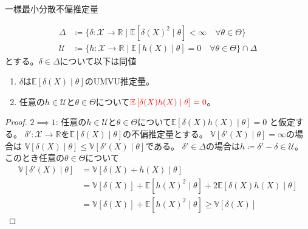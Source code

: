 \documentclass[lualatex,handout]{beamer}
\newcommand{\mycolor}[2]{%
  \begingroup
  \colorlet{currentcolor}{.}%
  \color{#1}#2%
  \color{currentcolor}%
  \endgroup
}
\newcommand{\emm}[1]{\mycolor{red}{#1}}
\newcommand{\expt}[1]{\mathbb{E}\left[#1\right]}
\newcommand{\var}[1]{\mathbb{V}\left[#1\right]}
\theoremstyle{definition}
\begin{document}
\begin{frame}{一様最小分散不偏推定量}
\small
\begin{theorem}

\vspace{-2em}
\begin{align*}
\Delta&\coloneq\{\delta\colon\mathcal{X}\to\mathbb{R}\mid \expt{\delta(X)^2\mid\theta}<\infty \quad\forall\theta\in\Theta\}\\
\mathcal{U}&\coloneq\{h\colon\mathcal{X}\to\mathbb{R}\mid \expt{h(X)\mid\theta}=0 \quad\forall\theta\in\Theta\} \cap\Delta
\end{align*}
とする。$\delta\in\Delta$について以下は同値
\begin{enumerate}
\item $\delta$は$\expt{\delta(X)\mid\theta}$のUMVU推定量。
\item 任意の$h\in\mathcal{U}$と$\theta\in\Theta$について$\emm{\expt{\delta(X)h(X)\mid\theta}=0}$。
\end{enumerate}
\end{theorem}
\begin{proof}
$2\implies 1$:
任意の$h\in\mathcal{U}$と$\theta\in\Theta$について$\expt{\delta(X)h(X)\mid\theta}=0$ と仮定する。
$\delta'\colon\mathcal{X}\to\mathbb{R}$を$\expt{\delta(X)\mid\theta}$の不偏推定量とする。
$\var{\delta'(X)\mid\theta}=\infty$の場合は
$\var{\delta(X)\mid\theta}\le\var{\delta'(X)\mid\theta}$である。
$\delta'\in\Delta$の場合は$h\coloneq\delta'-\delta\in\mathcal{U}$。
このとき任意の$\theta\in\Theta$について
\begin{align*}
\var{\delta'(X)\mid\theta} &= \var{\delta(X)+h(X)\mid\theta}\\
&= \var{\delta(X)}+\expt{h(X)^2\mid\theta} + 2\expt{\delta(X)h(X)\mid\theta}\\
&= \var{\delta(X)}+\expt{h(X)^2\mid\theta} \ge \var{\delta(X)}
\end{align*}
\end{proof}
\end{frame}
\end{document}
